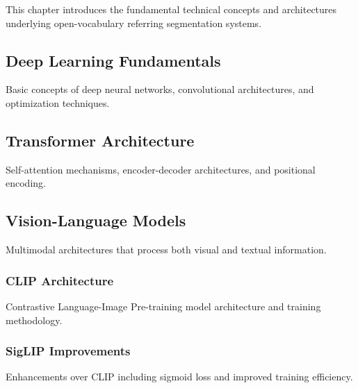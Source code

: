 \cleardoublepage
\label{chap:back}

This chapter introduces the fundamental technical concepts and architectures underlying open-vocabulary referring segmentation systems.

\subsection{Deep Learning Fundamentals}

Basic concepts of deep neural networks, convolutional architectures, and optimization techniques.

\subsection{Transformer Architecture}

Self-attention mechanisms, encoder-decoder architectures, and positional encoding.

\subsection{Vision-Language Models}

Multimodal architectures that process both visual and textual information.

\subsubsection{CLIP Architecture}

Contrastive Language-Image Pre-training model architecture and training methodology.

\subsubsection{SigLIP Improvements}

Enhancements over CLIP including sigmoid loss and improved training efficiency.

